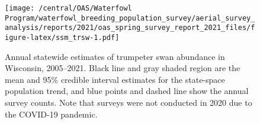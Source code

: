 \documentclass[
  12pt,
]{article}
\begin{document}
\newpage

\begin{figure}
\centering
\texttt{[image: /central/OAS/Waterfowl Program/waterfowl\_breeding\_population\_survey/aerial\_survey\_analysis/reports/2021/oas\_spring\_survey\_report\_2021\_files/figure-latex/ssm\_trsw-1.pdf]}
\caption{\label{fig:ssm_trsw}Annual statewide estimates of trumpeter
swan abundance in Wisconsin, 2005--2021. Black line and gray shaded
region are the mean and 95\% credible interval estimates for the
state-space population trend, and blue points and dashed line show the
annual survey counts. Note that surveys were not conducted in 2020 due
to the COVID-19 pandemic.}
\end{figure}
\end{document}
